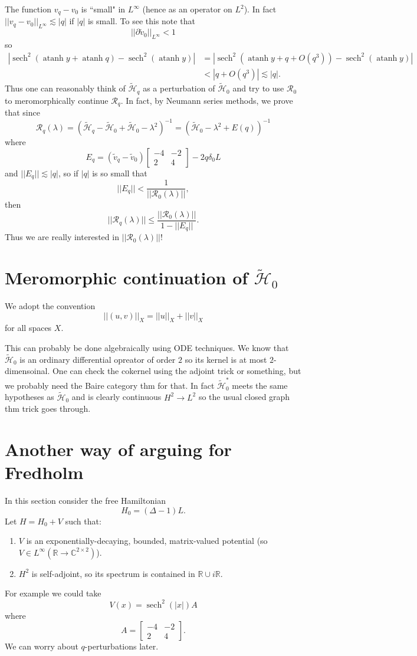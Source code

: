 \documentclass[12pt]{report}
\newcommand{\RR}{\mathbb{R}}
\newcommand{\CC}{\mathbb{C}}
\DeclareMathOperator{\atanh}{atanh}
\DeclareMathOperator{\sech}{sech}
\theoremstyle{definition}
\begin{document}
The function $v_q - v_0$ is ``small" in $L^\infty$ (hence as an operator on $L^2$). In fact $||v_q - v_0||_{L^\infty} \lesssim |q|$ if $|q|$ is small. To see this note that
$$||\partial \tilde v_0||_{L^\infty} < 1$$
so
\begin{align*}|\sech^2(\atanh y + \atanh q) - \sech^2(\atanh y)| &= |\sech^2(\atanh y + q + O(q^3)) - \sech^2(\atanh y)| \\&< |q + O(q^3)| \lesssim |q|.\end{align*}
Thus one can reasonably think of $\mathcal{\tilde H}_q$ as a perturbation of $\mathcal{\tilde H}_0$ and try to use $\mathcal R_0$ to meromorphically continue $\mathcal R_q$.
In fact, by Neumann series methods, we prove that since
$$\mathcal R_q(\lambda) = (\mathcal{\tilde H}_q - \mathcal{\tilde H}_0 + \mathcal{\tilde H}_0 - \lambda^2)^{-1} = (\mathcal{\tilde H}_0 - \lambda^2 + E(q))^{-1}$$
where
$$E_q = (\tilde v_q - \tilde v_0)\begin{bmatrix}-4 & -2\\2 & 4\end{bmatrix} - 2q\delta_0L$$
and $||E_q|| \lesssim |q|$, so if $|q|$ is so small that
$$||E_q|| < \frac{1}{||\mathcal R_0(\lambda)||},$$
then
$$||\mathcal R_q(\lambda)|| \leq \frac{||\mathcal R_0(\lambda)||}{1 - ||E_q||}.$$
Thus we are really interested in $||\mathcal R_0(\lambda)||$!

\section{Meromorphic continuation of $\mathcal{\tilde H}_0$}
We adopt the convention
$$||(u, v)||_X = ||u||_X + ||v||_X$$
for all spaces $X$.

This can probably be done algebraically using ODE techniques. We know that $\mathcal{\tilde H}_0$ is an ordinary differential opreator of order $2$ so its kernel is at most $2$-dimensoinal.
One can check the cokernel using the adjoint trick or something, but we probably need the Baire category thm for that.
In fact $\mathcal{\tilde H}_0^*$ meets the same hypotheses as $\mathcal{\tilde H}_0$ and is clearly continuous $H^2 \to L^2$ so the usual closed graph thm trick goes through.

\section{Another way of arguing for Fredholm}
In this section consider the free Hamiltonian
$$H_0 = (\Delta - 1)L.$$
Let $H = H_0 + V$ such that:
\begin{enumerate}
  \item $V$ is an exponentially-decaying, bounded, matrix-valued potential (so $V \in L^\infty(\RR \to \CC^{2 \times 2})$).
  \item $H^2$ is self-adjoint, so its spectrum is contained in $\RR \cup i\RR$.
\end{enumerate}
For example we could take
$$V(x) = \sech^2(|x|)A$$
where
$$A = \begin{bmatrix}-4 & -2\\ 2 & 4\end{bmatrix}.$$
We can worry about $q$-perturbations later.
\end{document}
